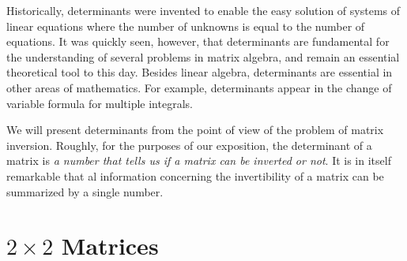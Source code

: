 \documentclass[12pt]{article}
\begin{document}
Historically, determinants were invented to enable the easy solution of systems of linear equations where the number of unknowns is equal to the number of equations. It was quickly seen, however, that determinants are fundamental for the understanding of several problems in matrix algebra, and remain an essential theoretical tool to this day. Besides linear algebra, determinants are essential in other areas of mathematics. For example, determinants appear in the change of variable formula for multiple integrals.

We will present determinants from the point of view of the problem of matrix inversion. Roughly, for the purposes of our exposition, the determinant of a matrix is \emph{a number that tells us if a matrix can be inverted or not}. It is in itself remarkable that al information concerning the invertibility of a matrix can be summarized by a single number.

\section{$2\times2$ Matrices}
\end{document}
